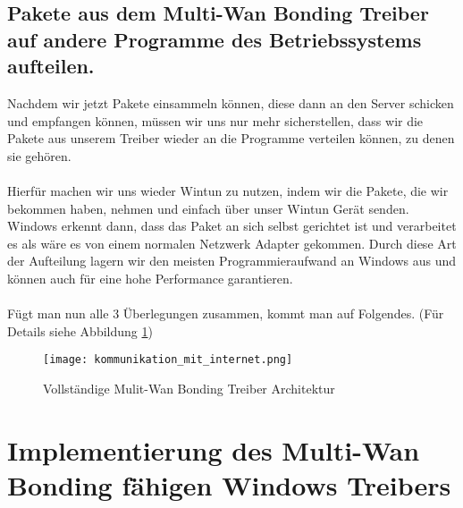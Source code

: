 \subsection{Pakete aus dem Multi-Wan Bonding Treiber auf andere Programme des Betriebssystems aufteilen.}
Nachdem wir jetzt Pakete einsammeln können, diese dann an den Server schicken und empfangen können, müssen wir uns nur mehr sicherstellen, dass wir die Pakete aus unserem Treiber wieder an die Programme verteilen können, zu denen sie gehören.
\\\\
Hierfür machen wir uns wieder Wintun zu nutzen, indem wir die Pakete, die wir bekommen haben, nehmen und einfach über unser Wintun Gerät senden. Windows erkennt dann, dass das Paket an sich selbst gerichtet ist und verarbeitet es als wäre es von einem normalen Netzwerk Adapter gekommen. Durch diese Art der Aufteilung lagern wir den meisten Programmieraufwand an Windows aus und können auch für eine hohe Performance garantieren.
\\\\
Fügt man nun alle 3 Überlegungen zusammen, kommt man auf Folgendes. (Für Details siehe Abbildung \ref{driver-full-architecture})
\begin{figure}[H]
    \centering
    \texttt{[image: kommunikation\_mit\_internet.png]}
    \caption[Vollständige Mulit-Wan Bonding Treiber Architektur]{Vollständige Mulit-Wan Bonding Treiber Architektur}
    \label{driver-full-architecture}
\end{figure}
\noindent

\newpage
\section{Implementierung des Multi-Wan Bonding fähigen Windows Treibers}
